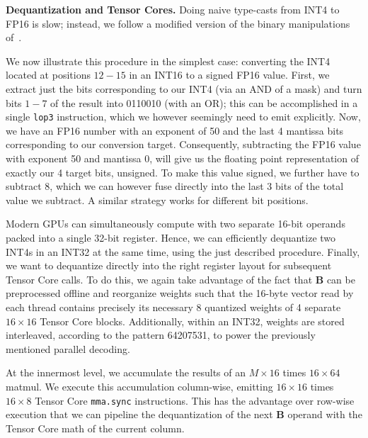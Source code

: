\documentclass{article}
\theoremstyle{plain}
\theoremstyle{definition}
\theoremstyle{remark}
\newcommand{\htor}[1]{\textcolor{green}{[htor: #1]}}
\newcommand{\code}[1]{\texttt{\small{#1}}}
\renewcommand{\paragraph}[1]{\vspace{0.1em}\noindent\textbf{#1}}
\begin{document}
\paragraph{Dequantization and Tensor Cores.}
Doing naive type-casts from INT4 to FP16 is slow; instead, we follow a modified version of the binary manipulations of~\citet{kim2022says}.

We now illustrate this procedure in the simplest case: converting the INT4 located at positions $12 - 15$ in an INT16 to a signed FP16 value. First, we extract just the bits corresponding to our INT4 (via an AND of a mask) and turn bits $1-7$ of the result into 0110010 (with an OR); this can be accomplished in a single \lstinline|lop3| instruction, which we however seemingly need to emit explicitly. Now, we have an FP16 number with an exponent of 50 and the last 4 mantissa bits corresponding to our conversion target. Consequently, subtracting the FP16 value with exponent 50 and mantissa 0, will give us the floating point representation of exactly our 4 target bits, unsigned. To make this value signed, we further have to subtract $8$, which we can however fuse directly into the last 3 bits of the total value we subtract. A similar strategy works for different bit positions.

Modern GPUs can simultaneously compute with two separate 16-bit operands packed into a single 32-bit register. Hence, we can efficiently dequantize two INT4s in an INT32 at the same time, using the just described procedure. Finally, we want to dequantize directly into the right register layout for subsequent Tensor Core calls. To do this, we again take advantage of the fact that $\mathbf{B}$ can be preprocessed offline and reorganize weights such that the 16-byte vector read by each thread contains precisely its necessary 8 quantized weights of 4 separate $16\times16$ Tensor Core blocks. Additionally, within an INT32, weights are stored interleaved, according to the pattern 64207531, to power the previously mentioned parallel decoding.


At the innermost level, we accumulate the results of an $M \times 16$ times $16 \times 64$ matmul. We execute this accumulation column-wise, emitting $16\times16$ times $16\times8$ Tensor Core \code{mma.sync} instructions. This has the advantage over row-wise execution that we can pipeline the dequantization of the next $\mathbf{B}$ operand with the Tensor Core math of the current column.
\end{document}
